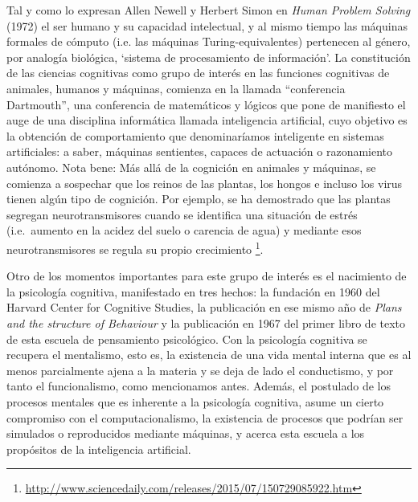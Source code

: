 \documentclass[12pt]{memoir}
\begin{document}
Tal y como lo expresan Allen Newell y Herbert Simon en \textit{Human Problem Solving}
(1972) el ser humano y su capacidad intelectual, y al mismo tiempo las máquinas formales de cómputo (i.e. las máquinas Turing-equivalentes) pertenecen al género, por analogía biológica, `sistema de procesamiento de información'. La constitución de las ciencias cognitivas como grupo de interés en las funciones cognitivas de animales, humanos y máquinas, comienza en la llamada ``conferencia Dartmouth'', una conferencia de matemáticos y lógicos que pone de manifiesto el auge de una disciplina informática llamada inteligencia artificial, cuyo objetivo es la obtención de comportamiento que denominaríamos inteligente en sistemas artificiales: a saber, máquinas sentientes, capaces de actuación o razonamiento autónomo. Nota bene: Más allá de la cognición en animales y máquinas, se comienza a sospechar que los reinos de las plantas, los hongos e incluso los virus tienen algún tipo de cognición. Por ejemplo, se ha demostrado que las plantas segregan neurotransmisores cuando se identifica una situación de estrés (i.e.\ aumento en la acidez del suelo o carencia de agua) y mediante esos neurotransmisores se regula su propio crecimiento \footnote{\url{http://www.sciencedaily.com/releases/2015/07/150729085922.htm} }.

Otro de los momentos importantes para este grupo de interés es el nacimiento de la psicología cognitiva, manifestado en tres hechos: la fundación en 1960 del Harvard Center for Cognitive Studies, la publicación en ese mismo año de \textit{Plans and the structure of Behaviour} y la publicación en 1967 del primer libro de texto de esta escuela de pensamiento psicológico. Con la psicología cognitiva se recupera el mentalismo, esto es, la existencia de una vida mental interna que es al menos parcialmente ajena a la materia y se deja de lado el conductismo, y por tanto el funcionalismo, como mencionamos antes. Además, el postulado de los procesos mentales que es inherente a la psicología cognitiva, asume un cierto compromiso con el computacionalismo, la existencia de procesos que podrían ser simulados o reproducidos mediante máquinas, y acerca esta escuela a los propósitos de la inteligencia artificial.
\end{document}

